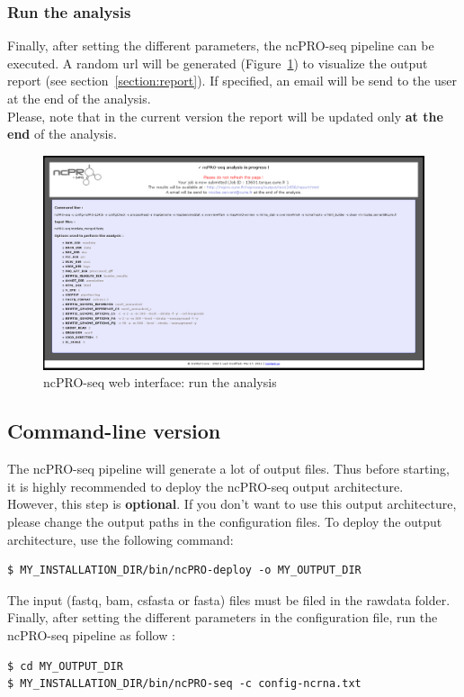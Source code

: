 \documentclass[12pt]{article}
\def \ncpip{ncPRO-seq}
\begin{document}
\subsubsection{Run the analysis}
Finally, after setting the different parameters, the \ncpip{} pipeline can be executed. A random url will be generated (Figure~\ref{fig:web8}) to visualize the output report (see section~\ref{section:report}). If specified, an email will be send to the user at the end of the analysis.\\
Please, note that in the current version the report will be updated only \textbf{at the end} of the analysis.
\begin{figure}[!h]
\includegraphics[width=\textwidth]{web_8.png}
\caption{\ncpip{} web interface: run the analysis}
\label{fig:web8}
\end{figure}
\newpage
\subsection{Command-line version}
\label{subsection:commandline}
The \ncpip{} pipeline will generate a lot of output files. Thus before starting, it is highly recommended to deploy the \ncpip{} output architecture.\\
However, this step is \textbf{optional}. If you don't want to use this output architecture, please change the output paths in the configuration files.
To deploy the output architecture, use the following command:
\begin{verbatim}
$ MY_INSTALLATION_DIR/bin/ncPRO-deploy -o MY_OUTPUT_DIR
\end{verbatim}

The input (fastq, bam, csfasta or fasta) files must be filed in the rawdata folder.
Finally, after setting the different parameters in the configuration file, run the ncPRO-seq pipeline as follow : 
\begin{verbatim}
$ cd MY_OUTPUT_DIR
$ MY_INSTALLATION_DIR/bin/ncPRO-seq -c config-ncrna.txt
\end{verbatim}
\end{document}

